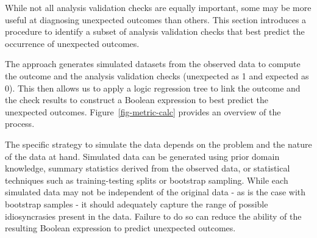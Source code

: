 \documentclass[
  12pt,
]{interact}
\begin{document}
While not all analysis validation checks are equally important, some may
be more useful at diagnosing unexpected outcomes than others. This
section introduces a procedure to identify a subset of analysis
validation checks that best predict the occurrence of unexpected
outcomes.

The approach generates simulated datasets from the observed data to
compute the outcome and the analysis validation checks (unexpected as 1
and expected as 0). This then allows us to apply a logic regression tree
to link the outcome and the check results to construct a Boolean
expression to best predict the unexpected outcomes.
Figure~\ref{fig-metric-calc} provides an overview of the process.

The specific strategy to simulate the data depends on the problem and
the nature of the data at hand. Simulated data can be generated using
prior domain knowledge, summary statistics derived from the observed
data, or statistical techniques such as training-testing splits or
bootstrap sampling. While each simulated data may not be independent of
the original data - as is the case with bootstrap samples - it should
adequately capture the range of possible idiosyncrasies present in the
data. Failure to do so can reduce the ability of the resulting Boolean
expression to predict unexpected outcomes.
\end{document}
